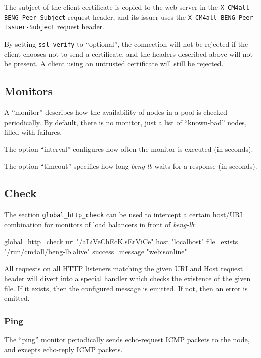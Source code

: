 \documentclass[a4paper,12pt]{article}
\begin{document}
The subject of the client certificate is copied to the web server in
the \verb|X-CM4all-BENG-Peer-Subject| request header, and its issuer
uses the \verb|X-CM4all-BENG-Peer-Issuer-Subject| request header.

By setting \verb|ssl_verify| to ``optional'', the connection will not
be rejected if the client chooses not to send a certificate, and the
headers described above will not be present.  A client using an
untrusted certificate will still be rejected.

\subsection{Monitors}

A ``monitor'' describes how the availability of nodes in a pool is
checked periodically.  By default, there is no monitor, just a list of
``known-bad'' nodes, filled with failures.

The option ``interval'' configures how often the monitor is executed
(in seconds).

The option ``timeout'' specifies how long \emph{beng-lb} waits for a
response (in seconds).

\subsection{Check}

The section \verb|global_http_check| can be used to intercept a
certain host/URI combination for monitors of load balancers in front
of \emph{beng-lb}:

\begin{verbatim*}
global_http_check {
  uri "/aLiVeChEcK.sErViCe"
  host "localhost"
  file_exists "/run/cm4all/beng-lb.alive"
  success_message "webisonline"
}
\end{verbatim*}

All requests on all HTTP listeners matching the given URI and Host
request header will divert into a special handler which checks the
existence of the given file.  If it exists, then the configured
message is emitted.  If not, then an error is emitted.

\subsubsection{Ping}

The ``ping'' monitor periodically sends echo-request ICMP packets to
the node, and excepts echo-reply ICMP packets.
\end{document}
